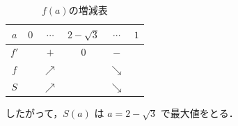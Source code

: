 \documentclass[../../main.tex]{subfiles}
\begin{document}
\begin{table}[htb]
  \centering
  \caption{$f(a)$の増減表}
  \begin{tabular}{|c|c|c|c|c|c|}
    \hline
    $a$ & $0$ & $\cdots$ & $2-\sqrt{3}$ & $\cdots$ & $1$ \\
    \hline
    $f'$ & & $+$ & $0$ & $-$ & \\
    \hline
    $f$ & & $\nearrow$ & & $\searrow$ & \\
    \hline
    $S$ & & $\nearrow$ & & $\searrow$ & \\
    \hline
  \end{tabular}
\end{table}

したがって，$S(a)$ は $a=2-\sqrt{3}$ で最大値をとる．
\end{document}
